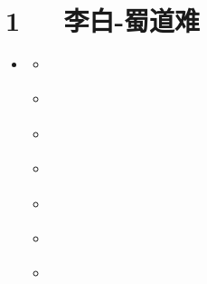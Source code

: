 \documentclass[letterpaper,12pt,english]{sphinxmanual}
\begin{document}
\chapter{1   李白-蜀道难}
\label{\detokenize{p01_u6563_u6587/_u674e_u767d-_u8700_u9053_u96be:id1}}\label{\detokenize{p01_u6563_u6587/_u674e_u767d-_u8700_u9053_u96be::doc}}
\begin{sphinxShadowBox}
\begin{itemize}
\item {} 
\label{\detokenize{p01_u6563_u6587/_u674e_u767d-_u8700_u9053_u96be:id10}}{\hyperref[\detokenize{p01_u6563_u6587/_u674e_u767d-_u8700_u9053_u96be:id1}]{}}
\begin{itemize}
\item {} 
\label{\detokenize{p01_u6563_u6587/_u674e_u767d-_u8700_u9053_u96be:id11}}{\hyperref[\detokenize{p01_u6563_u6587/_u674e_u767d-_u8700_u9053_u96be:id3}]{}}

\item {} 
\label{\detokenize{p01_u6563_u6587/_u674e_u767d-_u8700_u9053_u96be:id12}}{\hyperref[\detokenize{p01_u6563_u6587/_u674e_u767d-_u8700_u9053_u96be:id4}]{}}

\item {} 
\label{\detokenize{p01_u6563_u6587/_u674e_u767d-_u8700_u9053_u96be:id13}}{\hyperref[\detokenize{p01_u6563_u6587/_u674e_u767d-_u8700_u9053_u96be:id5}]{}}

\item {} 
\label{\detokenize{p01_u6563_u6587/_u674e_u767d-_u8700_u9053_u96be:id14}}{\hyperref[\detokenize{p01_u6563_u6587/_u674e_u767d-_u8700_u9053_u96be:id6}]{}}

\item {} 
\label{\detokenize{p01_u6563_u6587/_u674e_u767d-_u8700_u9053_u96be:id15}}{\hyperref[\detokenize{p01_u6563_u6587/_u674e_u767d-_u8700_u9053_u96be:id7}]{}}

\item {} 
\label{\detokenize{p01_u6563_u6587/_u674e_u767d-_u8700_u9053_u96be:id16}}{\hyperref[\detokenize{p01_u6563_u6587/_u674e_u767d-_u8700_u9053_u96be:id8}]{}}

\item {} 
\label{\detokenize{p01_u6563_u6587/_u674e_u767d-_u8700_u9053_u96be:id17}}{\hyperref[\detokenize{p01_u6563_u6587/_u674e_u767d-_u8700_u9053_u96be:id9}]{}}

\end{itemize}

\end{itemize}
\end{sphinxShadowBox}
\end{document}
